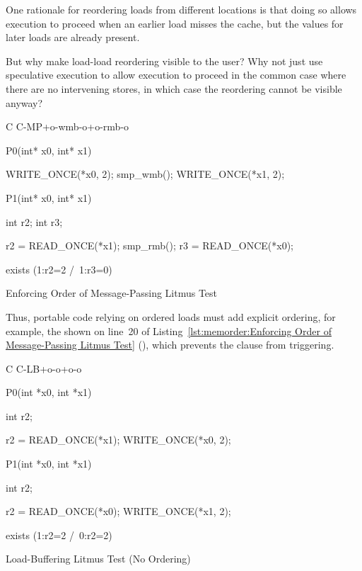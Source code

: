 One rationale for reordering loads from different locations is that doing
so allows execution to proceed when an earlier load misses the cache,
but the values for later loads are already present.

\QuickQuiz{}
	But why make load-load reordering visible to the user?
	Why not just use speculative execution to allow execution to
	proceed in the common case where there are no intervening
	stores, in which case the reordering cannot be visible anyway?
 \QuickQuizEnd

\begin{listing}[tbp]
{ \scriptsize
\begin{verbbox}[\LstLineNo]
C C-MP+o-wmb-o+o-rmb-o

{
}

P0(int* x0, int* x1) {

  WRITE_ONCE(*x0, 2);
  smp_wmb();
  WRITE_ONCE(*x1, 2);

}

P1(int* x0, int* x1) {

  int r2;
  int r3;

  r2 = READ_ONCE(*x1);
  smp_rmb();
  r3 = READ_ONCE(*x0);

}

exists (1:r2=2 /\ 1:r3=0)
\end{verbbox}
}
\centering
\theverbbox
\caption{Enforcing Order of Message-Passing Litmus Test}
\label{lst:memorder:Enforcing Order of Message-Passing Litmus Test}
\end{listing}

Thus, portable code relying on ordered loads must
add explicit ordering, for example, the  shown on
line~20 of
Listing~\ref{lst:memorder:Enforcing Order of Message-Passing Litmus Test}
(), which prevents
the  clause from triggering.

\begin{listing}[tbp]
{ \scriptsize
\begin{verbbox}[\LstLineNo]
C C-LB+o-o+o-o
{
}

P0(int *x0, int *x1)
{
  int r2;

  r2 = READ_ONCE(*x1);
  WRITE_ONCE(*x0, 2);
}


P1(int *x0, int *x1)
{
  int r2;

  r2 = READ_ONCE(*x0);
  WRITE_ONCE(*x1, 2);
}

exists (1:r2=2 /\ 0:r2=2)
\end{verbbox}
}
\centering
\theverbbox
\caption{Load-Buffering Litmus Test (No Ordering)}
\label{lst:memorder:Load-Buffering Litmus Test (No Ordering)}
\end{listing}

